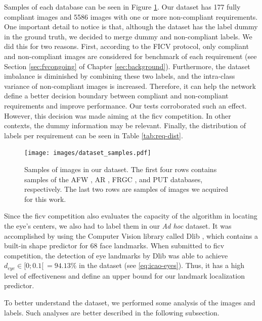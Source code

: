 Samples of each database can be seen in Figure \ref{fig:dataset_samples}. Our dataset has 177 fully compliant images and 5586 images with one or more non-compliant requirements. One important detail to notice is that, although the \adhoc dataset has the label dummy in the ground truth, we decided to merge dummy and non-compliant labels. We did this for two reasons. First, according to the FICV protocol, only compliant and non-compliant images are considered for benchmark of each requirement (see Section \ref{sec:fvcongoing} of Chapter \ref{sec:background}). Furthermore, the dataset imbalance is diminished by combining these two labels, and the intra-class variance of non-compliant images is increased. Therefore, it can help the network define a better decision boundary between compliant and non-compliant requirements and improve performance. Our tests corroborated such an effect. However, this decision was made aiming at the \acs{ficv} competition. In other contexts, the dummy information may be relevant. Finally, the distribution of labels per requirement can be seen in Table \ref{tab:req-dist}. 

\begin{figure}[tb]
\centering
\texttt{[image: images/dataset\_samples.pdf]}
\caption{Samples of images in our dataset. The first four rows contains samples of the AFW \citep{databaseAFW}, AR \citep{martinez1998ar}, FRGC \citep{databaseFRGC}, and PUT \citep{kasinski2008put} databases, respectively. The last two rows are samples of images we acquired for this work.}
\label{fig:dataset_samples}
\end{figure}



Since the \acs{ficv} competition also evaluates the capacity of the algorithm in locating the eye's centers, we also had to label them in our \textit{Ad hoc} dataset. It was accomplished by using the Computer Vision library called Dlib \citep{dlib}, which contains a built-in shape predictor for 68 face landmarks. When submitted to \acs{ficv} competition, the detection of eye landmarks by Dlib was able to achieve $d_{eye} \in [0;0.1[\ = 94.13\%$ in the \ficvtest dataset (see \autoref{eq:icao-eyes}). Thus, it has a high level of effectiveness and define an upper bound for our landmark localization predictor.

To better understand the \adhoc dataset, we performed some analysis of the images and labels. Such analyses are better described in the following subsection.

